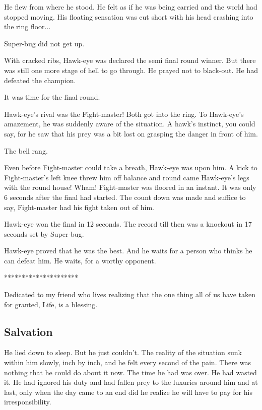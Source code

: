 \documentclass[twoside,11pt,titlepage]{article}
\begin{document}
He flew from where he stood. He felt as if he was being carried and the world had stopped moving. His floating sensation was cut short with his head crashing into the ring floor...

Super-bug did not get up.

With cracked ribs, Hawk-eye was declared the semi final round winner. But there was still one more stage of hell to go through. He prayed not to black-out. He had defeated the champion.

It was time for the final round.

Hawk-eye's rival was the Fight-master! Both got into the ring. To Hawk-eye's amazement, he was suddenly aware of the situation. A hawk's instinct, you could say, for he saw that his prey was a bit lost on grasping the danger in front of him.

The bell rang.

Even before Fight-master could take a breath, Hawk-eye was upon him. A kick to Fight-master's left knee threw him off balance and round came Hawk-eye's legs with the round house! Wham! Fight-master was floored in an instant. It was only 6 seconds after the final had started. The count down was made and suffice to say, Fight-master had his fight taken out of him.

Hawk-eye won the final in 12 seconds. The record till then was a knockout in 17 seconds set by Super-bug.

Hawk-eye proved that he was the best. And he waits for a person who thinks he can defeat him. He waits, for a worthy opponent.

\bigskip
\begin{center}
*********************
\end{center}

Dedicated to my friend who lives realizing that the one thing all of us have taken for granted, Life, is a blessing.

\newpage

\begin{center}
  \section{Salvation}
\end{center}
\bigskip
\bigskip
\bigskip

He lied down to sleep. But he just couldn't. The reality of the situation sunk within him slowly, inch by inch, and he felt every second of the pain. There was nothing that he could do about it now. The time he had was over. He had wasted it. He had ignored his duty and had fallen prey to the luxuries around him and at last, only when the day came to an end did he realize he will have to pay for his irresponsibility.
\end{document}
